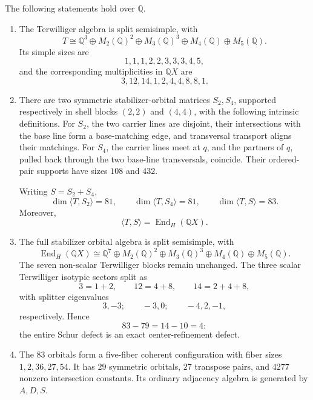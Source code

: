\begin{theorem}
The following statements hold over $\mathbb Q$.
\begin{enumerate}
\item The Terwilliger algebra is split semisimple, with
\[
T\cong
\mathbb Q^3\oplus M_2(\mathbb Q)^2\oplus M_3(\mathbb Q)^3
\oplus M_4(\mathbb Q)\oplus M_5(\mathbb Q).
\]
Its simple sizes are
\[
1,1,1,2,2,3,3,3,4,5,
\]
and the corresponding multiplicities in $\mathbb QX$ are
\[
3,12,14,1,2,4,4,8,8,1.
\]

\item There are two symmetric stabilizer-orbital matrices $S_2,S_4$,
supported respectively in shell blocks $(2,2)$ and $(4,4)$, with the
following intrinsic definitions.  For $S_2$, the two carrier lines are
disjoint, their intersections with the base line form a base-matching edge,
and transversal transport aligns their matchings.  For $S_4$, the carrier
lines meet at $q$, and the partners of $q$, pulled back through the two
base-line transversals, coincide.  Their ordered-pair supports have sizes
$108$ and $432$.

Writing $S=S_2+S_4$,
\[
\dim\langle T,S_2\rangle=81,
\qquad
\dim\langle T,S_4\rangle=81,
\qquad
\dim\langle T,S\rangle=83.
\]
Moreover,
\[
\langle T,S\rangle=\operatorname{End}_H(\mathbb QX).
\]

\item The full stabilizer orbital algebra is split semisimple, with
\[
\operatorname{End}_H(\mathbb QX)
\cong
\mathbb Q^7\oplus M_2(\mathbb Q)^2\oplus M_3(\mathbb Q)^3
\oplus M_4(\mathbb Q)\oplus M_5(\mathbb Q).
\]
The seven non-scalar Terwilliger blocks remain unchanged.  The three scalar
Terwilliger isotypic sectors split as
\[
3=1+2,
\qquad
12=4+8,
\qquad
14=2+4+8,
\]
with splitter eigenvalues
\[
3,-3;
\qquad
-3,0;
\qquad
-4,2,-1,
\]
respectively.  Hence
\[
83-79=14-10=4:
\]
the entire Schur defect is an exact center-refinement defect.

\item The $83$ orbitals form a five-fiber coherent configuration with fiber
sizes $1,2,36,27,54$.  It has $29$ symmetric orbitals, $27$ transpose
pairs, and $4277$ nonzero intersection constants.  Its ordinary adjacency
algebra is generated by $A,D,S$.
\end{enumerate}
\end{theorem}

